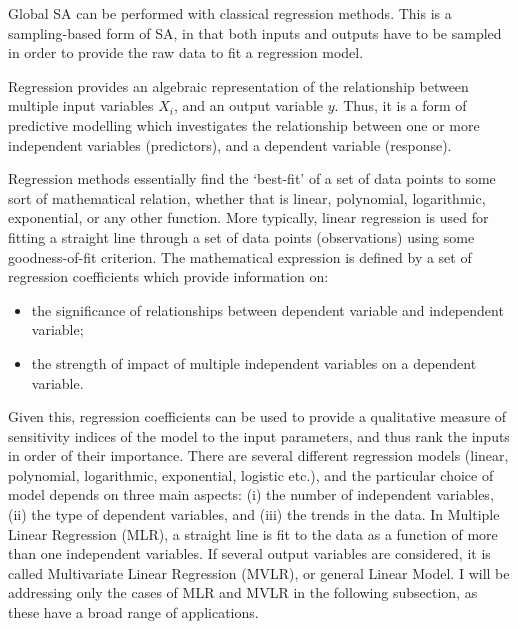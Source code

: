 \documentclass[12pt]{article}
\begin{document}
Global SA can be performed with classical regression methods. This is a sampling-based form of SA, in that both inputs and outputs have to be sampled in order to provide the raw data to fit a regression model. 

 Regression provides an algebraic representation of the relationship between multiple input variables $X_{i}$, and an output variable $y$. Thus, it is a form of predictive modelling which investigates the relationship between one or more independent variables (predictors), and a dependent variable (response). 

Regression methods essentially find the `best-fit' of a set of data points to some sort of mathematical relation, whether that is linear, polynomial, logarithmic, exponential, or any other function. More typically, linear regression is used for fitting a straight line through a set of data points (observations) using some goodness-of-fit criterion. The mathematical expression is defined by a set of regression coefficients which provide information on:

\begin{itemize}
	\item  the significance of relationships between dependent variable and independent variable;
	\item  the strength of impact of multiple independent variables on a dependent variable.
\end{itemize}

Given this, regression coefficients can be used to provide a qualitative measure of sensitivity indices of the model to the input parameters, and thus rank the inputs in order of their importance. There are several different regression models (linear, polynomial, logarithmic, exponential, logistic etc.), and the particular choice of model depends on three main aspects: (i) the number of independent variables, (ii) the type of dependent variables, and (iii) the trends in the data. In Multiple Linear Regression (MLR), a straight line is fit to the data as a function of more than one independent variables. If several output variables are considered, it is called Multivariate Linear Regression (MVLR), or general Linear Model. I will be addressing only the cases of MLR and MVLR in the following subsection, as these have a broad range of applications.
\end{document}

